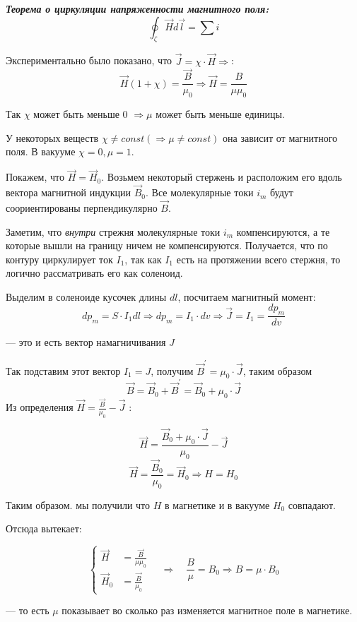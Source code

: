 \documentclass[../main.tex]{subfiles}
\begin{document}
\textit{\textbf{Теорема о циркуляции напряженности магнитного поля:}}
\[\oint_{\zeta} \vec H d \vec l = \sum i\]

Экспериментально было показано, что $\vec J = \chi \cdot \vec H \Rightarrow$:
\[\vec H(1+ \chi) = \frac{\vec B}{\mu_0} \Rightarrow \vec H = \frac{B}{\mu \mu_0}\]

Так $\chi$ может быть меньше 0 $\Rightarrow \mu $ может быть меньше единицы. 

У некоторых веществ $\chi \neq const (\Rightarrow \mu \neq const )$ она зависит от магнитного поля.
В вакууме $\chi = 0, \mu = 1$.

Покажем, что $\vec H = \vec H_0$. Возьмем некоторый стержень и расположим его вдоль вектора магнитной индукции $\vec B_0$. Все молекулярные токи $i_m$ будут соориентированы перпендикулярно $\vec B$.

Заметим, что \textit{внутри} стрежня молекулярные токи $i_m$ компенсируются, а те которые вышли на границу ничем не компенсируются. Получается, что по контуру 
циркулирует ток $I_1$, так как $I_1$ есть на протяжении всего стержня, то логично рассматривать его как соленоид.

\vspace{5px}

Выделим в соленоиде кусочек длины $dl$, посчитаем магнитный момент:
\[dp_m = S \cdot I_1 dl \Rightarrow dp_m = I_1 \cdot dv \Rightarrow \vec J = I_1 = \frac{dp_m}{dv}\]
\begin{center}
    --- это и есть вектор намагничивания $J$
\end{center}
Так подставим этот вектор $I_1 = J$, получим $\vec B^{\prime} = \mu_0 \cdot \vec J$, таким образом 
\[\vec B = \vec B_0 + \vec B^{\prime} = \vec B_0 + \mu_0 \cdot \vec J\]
Из определения $\vec H = \frac{\vec B}{\mu_0} - \vec J$ :

\[\vec H = \frac{\vec B_0 + \mu_0 \cdot \vec J }{\mu_0} - \vec J\]
\[\vec H = \frac{\vec B_0}{\mu_0} = \vec H_0 \Rightarrow H = H_0\]

Таким образом. мы получили что $H$ в магнетике и в вакууме $H_0$ совпадают.

Отсюда вытекает:

\[
\left\{
\begin{aligned}
    \vec H &= \frac{\vec B}{\mu \mu_0} \\
    \vec H_0 &= \frac{\vec B}{\mu_0}
\end{aligned}
\right.
\quad \Rightarrow \quad
\frac{B}{\mu} = B_0 \Rightarrow B = \mu \cdot B_0
\]
\begin{center}
    --- то есть $ \mu$ показывает во сколько раз изменяется магнитное поле в магнетике.
\end{center}
\end{document}
